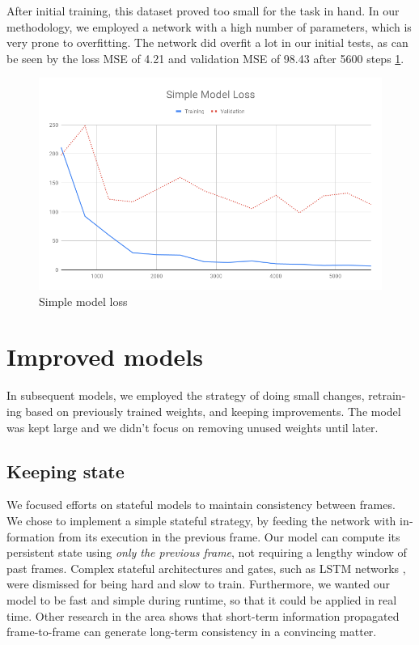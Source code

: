 \documentclass[12pt,openright,oneside,a4paper,english]{abntex2}
\begin{document}
\begin{otherlanguage}{english}
After initial training, this dataset proved too small for the task in hand. In our methodology, we employed a network with a high number of parameters, which is very prone to overfitting. The network did overfit a lot in our initial tests, as can be seen by the loss MSE of 4.21 and validation MSE of 98.43 after 5600 steps \ref{simple_loss}.

\begin{figure}[!htb]
\centering
\includegraphics[width=\textwidth]{loss/Simple}
\caption{Simple model loss}
\label{simple_loss}
\end{figure}

\section{Improved models}

In subsequent models, we employed the strategy of doing small changes, retraining based on previously trained weights, and keeping improvements. The model was kept large and we didn't focus on removing unused weights until later.

\subsection{Keeping state}
\label{keeping_state}

We focused efforts on stateful models to maintain consistency between frames. We chose to implement a simple stateful strategy, by feeding the network with information from its execution in the previous frame. Our model can compute its persistent state using \textit{only the previous frame}, not requiring a lengthy window of past frames. Complex stateful architectures and gates, such as LSTM networks %
, were dismissed for being hard and slow to train. Furthermore, we wanted our model to be fast and simple during runtime, so that it could be applied in real time. Other research in the area \cite{MSFT_transfer}
shows that short-term information propagated frame-to-frame can generate long-term consistency in a convincing matter.


\end{otherlanguage}
\end{document}
